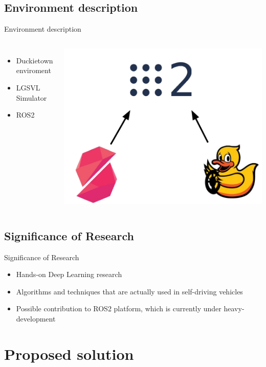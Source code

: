 \documentclass{beamer}
\begin{document}
\subsection{Environment description}
\begin{frame}{Environment description}
\begin{columns}
\begin{itemize}
    \item Duckietown enviroment
    \item LGSVL Simulator
    \item ROS2
\end{itemize}

    \includegraphics[width=0.75\linewidth]{fig/SS_AI.pdf}
\end{columns}

\end{frame}

\subsection{Significance of Research }
\begin{frame}{Significance of Research }
    \begin{itemize}
        \item Hands-on Deep Learning research
        \item Algorithms and techniques that are actually used in self-driving vehicles
        \item Possible contribution to ROS2 platform, which is currently under heavy-development
    \end{itemize}
\end{frame}

\section{Proposed solution}
\end{document}
